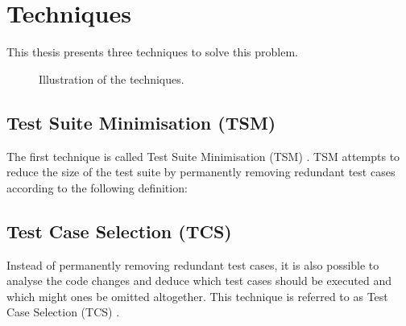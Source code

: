 \section{Techniques}
\noindent This thesis presents three techniques to solve this problem.

\begin{figure*}[t]
	\centering
	\hfill
	\hfill
	\caption{Illustration of the techniques.}
\end{figure*}

\subsection{Test Suite Minimisation (TSM)}
\noindent The first technique is called Test Suite Minimisation (TSM) \cite{10.1002/stv.430}. TSM attempts to reduce the size of the test suite by permanently removing redundant test cases according to the following definition:\\

\noindent{}

\subsection{Test Case Selection (TCS)}
\noindent Instead of permanently removing redundant test cases, it is also possible to analyse the code changes and deduce which test cases should be executed and which might ones be omitted altogether. This technique is referred to as Test Case Selection (TCS) \cite{10.1002/stv.430}.\\

